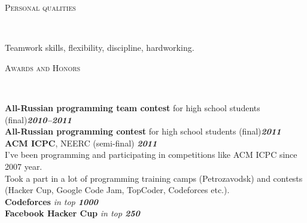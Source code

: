 \documentclass[12pt]{article}
\newenvironment{changemargin}[2]{%
  \begin{list}{}{%
    \setlength{\topsep}{0pt}%
    \setlength{\leftmargin}{#1}%
    \setlength{\rightmargin}{#2}%
    \setlength{\listparindent}{\parindent}%
    \setlength{\itemindent}{\parindent}%
    \setlength{\parsep}{\parskip}%
  }%
  \item[]}{\end{list}
}
\newcommand{\lineover}{
	\begin{changemargin}{-0.05in}{-0.05in}
		\vspace*{-8pt}
		\hrulefill \\
		\vspace*{-2pt}
	\end{changemargin}
}
\newcommand{\header}[1]{
	\begin{changemargin}{-0.5in}{-0.5in}
		\scshape{#1}\\
  	\lineover
	\end{changemargin}
}
\newenvironment{body} {
	\vspace*{-16pt}
	\begin{changemargin}{-0.25in}{-0.5in}
  }	
	{\end{changemargin}
}
\begin{document}
\vspace{14pt}
\smallskip
\newpage
\header{Personal qualities}

\begin{body}
	\vspace{14pt}
	Teamwork skills, flexibility, discipline, hardworking.
\end{body}

\smallskip

\header{Awards and Honors}

\begin{body}
	\vspace{14pt}
	\textbf{All-Russian programming team contest} for high school students (final)\hfill \emph{\textbf{2010--2011}}\\
	\smallskip
	\textbf{All-Russian programming contest} for high school students (final)\hfill \emph{\textbf{2011}}\\
	\smallskip
	\textbf{ACM ICPC}, NEERC (semi-final) \hfill{} \emph{\textbf{2011}}\\
	\smallskip
	\vspace{14pt}
	I've been programming and participating in competitions like ACM ICPC since 2007 year. \\
	Took a part in a lot of programming training camps (Petrozavodsk) and contests (Hacker Cup, Google Code Jam, TopCoder, Codeforces etc.).\\
	\smallskip
	\textbf{Codeforces} \hfill{} \emph{in top \textbf{1000}}\\
	\smallskip
	\textbf{Facebook Hacker Cup} \hfill{} \emph{in top \textbf{250}}\\
	\smallskip
\end{body}
\end{document}

